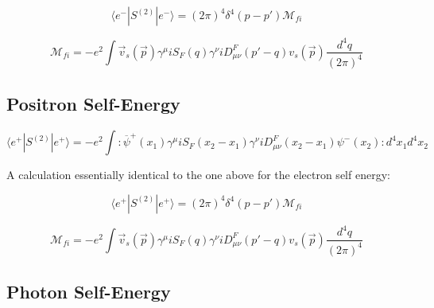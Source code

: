\documentclass[a4]{article}
\begin{document}
        \begin{framed}

            \begin{equation}
                \langle e^{-} | S^{(2)} | e^{-} \rangle = (2 \pi)^4 \delta^{4} (p - p') \mathcal{M}_{fi}
            \end{equation}

            \begin{equation}
                \mathcal{M}_{fi} = - e^2 \int \vec{v}_{s} (\vec{p}) \gamma^{\mu} i S_{F} (q) \gamma^{\nu} i D_{\mu \nu}^{F} (p' - q) v_{s} (\vec{p}) \frac{d^{4} q}{(2 \pi)^4}
            \end{equation}

        \end{framed}

        \subsection{Positron Self-Energy}

        \begin{framed}

            \begin{equation}
                \langle e^{+} | S^{(2)} | e^{+} \rangle = -e^{2} \int :\overline{\psi}^{+} (x_1) \gamma^{\mu} i S_{F} (x_2 - x_1) \gamma^{\nu} i D^{F}_{\mu \nu} (x_2 - x_1) \psi^{-} (x_2): d^4 x_1 d^4 x_2
            \end{equation}

            A calculation essentially identical to the one above for the electron self energy:

            \begin{equation}
                \langle e^{+} | S^{(2)} | e^{+} \rangle = (2 \pi)^4 \delta^{4} (p - p') \mathcal{M}_{fi}
            \end{equation}

            \begin{equation}
                \mathcal{M}_{fi} = - e^2 \int \vec{v}_{s} (\vec{p}) \gamma^{\mu} i S_{F} (q) \gamma^{\nu} i D_{\mu \nu}^{F} (p' - q) v_{s} (\vec{p}) \frac{d^{4} q}{(2 \pi)^4}
            \end{equation}

        \end{framed}

        \subsection{Photon Self-Energy}
\end{document}
